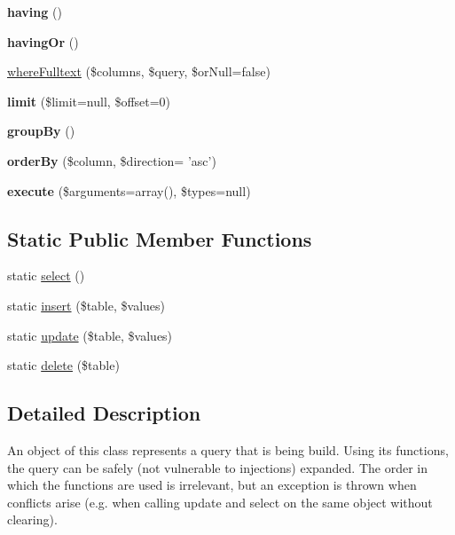 \begin{DoxyCompactItemize}
\item 
\hypertarget{classQuery_a050021933ad19f7394afd8c47bd1e4ed}{
{\bfseries having} ()}
\label{classQuery_a050021933ad19f7394afd8c47bd1e4ed}

\item 
\hypertarget{classQuery_a7810e3ea656afdda873b5985da14386b}{
{\bfseries havingOr} ()}
\label{classQuery_a7810e3ea656afdda873b5985da14386b}

\item 
\hyperlink{classQuery_a0aca93c257130b80f2361b97f1391cc4}{whereFulltext} (\$columns, \$query, \$orNull=false)
\item 
\hypertarget{classQuery_ae9110a507cead8d0c57099aaab273799}{
{\bfseries limit} (\$limit=null, \$offset=0)}
\label{classQuery_ae9110a507cead8d0c57099aaab273799}

\item 
\hypertarget{classQuery_af8940f0c7aede42d1029995396d787ff}{
{\bfseries groupBy} ()}
\label{classQuery_af8940f0c7aede42d1029995396d787ff}

\item 
\hypertarget{classQuery_a89307b4afda564f5ea9afb0733007161}{
{\bfseries orderBy} (\$column, \$direction= 'asc')}
\label{classQuery_a89307b4afda564f5ea9afb0733007161}

\item 
\hypertarget{classQuery_aaffa7dab063581b36110f081a9a16ff8}{
{\bfseries execute} (\$arguments=array(), \$types=null)}
\label{classQuery_aaffa7dab063581b36110f081a9a16ff8}

\end{DoxyCompactItemize}
\subsection*{Static Public Member Functions}
\begin{DoxyCompactItemize}
\item 
static \hyperlink{classQuery_af2be941b80c1e376f373ff3d25928a70}{select} ()
\item 
static \hyperlink{classQuery_abbefb2e22d6caa9727832bd60ccb46db}{insert} (\$table, \$values)
\item 
static \hyperlink{classQuery_abcc72cbfecd4b301f964960dad0611e2}{update} (\$table, \$values)
\item 
static \hyperlink{classQuery_a5c5ec3da901616c9b405b686d3d338ab}{delete} (\$table)
\end{DoxyCompactItemize}


\subsection{Detailed Description}
An object of this class represents a query that is being build. Using its functions, the query can be safely (not vulnerable to injections) expanded. The order in which the functions are used is irrelevant, but an exception is thrown when conflicts arise (e.g. when calling update and select on the same object without clearing).

